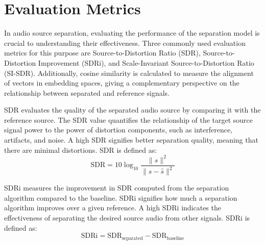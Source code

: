 \documentclass[11pt]{article}
\begin{document}

\section{Evaluation Metrics}
In audio source separation, evaluating the performance of the separation model is crucial to understanding their effectiveness. Three commonly used evaluation metrics for this purpose are Source-to-Distortion Ratio (SDR), Source-to-Distortion Improvement (SDRi), and Scale-Invariant Source-to-Distortion Ratio (SI-SDR). Additionally, cosine similarity is calculated to measure the alignment of vectors in embedding spaces, giving a complementary perspective on the relationship between separated and reference signals.

SDR evaluates the quality of the separated audio source by comparing it with the reference source. The SDR value quantifies the relationship of the target source signal power to the power of distortion components, such as interference, artifacts, and noise. A high SDR signifies better separation quality, meaning that there are minimal distortions. SDR is defined as:
\[
\text{SDR} = 10 \log_{10} \frac{\| s \|^2}{\| s - \hat{s} \|^2}
\]

SDRi measures the improvement in SDR computed from the separation algorithm compared to the baseline. SDRi signifies how much a separation algorithm improves over a given reference. A high SDRi indicates the effectiveness of separating the desired source audio from other signals. SDRi is defined as:
\[
\text{SDRi} = \text{SDR}_{\text{separated}} - \text{SDR}_{\text{baseline}}
\]
\end{document}

